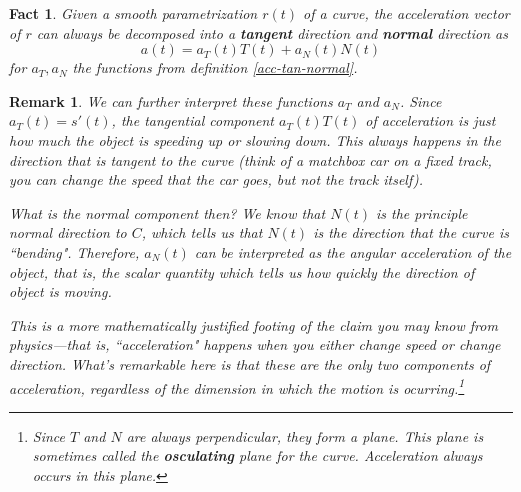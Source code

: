 \documentclass[12pt]{article}
\numberwithin{equation}{subsection}
\numberwithin{figure}{subsection}
\newtheorem{fact}[subsection]{Fact}
\theoremstyle{note}
\newtheorem{remark}[subsection]{Remark}
\begin{document}
{\begin{fact}
	Given a smooth parametrization $r(t)$ of a curve, the acceleration vector of $r$ can always be decomposed into a \textbf{tangent} direction and \textbf{normal} direction as \[ a(t)=a_T(t)T(t)+a_N(t)N(t)\]  for $a_T, a_N$ the functions from definition \ref{acc-tan-normal}.
\end{fact}

\begin{remark}
	We can further interpret these functions $a_T$ and $a_N$. Since $a_T(t)=s'(t)$, the \textit{tangential component} $a_T(t)T(t)$ of acceleration is just how much the object is speeding up or slowing down. This always happens in the direction that is tangent to the curve (think of a matchbox car on a fixed track, you can change the speed that the car goes, but not the track itself). 
	
	What is the \textit{normal component} then? We know that $N(t)$ is the principle normal direction to $C$, which tells us that $N(t)$ is the direction that the curve is ``bending". Therefore, $a_N(t)$ can be interpreted as the angular acceleration of the object, that is, the scalar quantity which tells us how quickly the direction of object is moving. 
	
	This is a more mathematically justified footing of the claim you may know from physics---that is, ``acceleration" happens when you either change speed \textit{or} change direction. What's remarkable here is that these are the only two components of acceleration, regardless of the dimension in which the motion is ocurring.\footnote{Since $T$ and $N$ are always perpendicular, they form a plane. This plane is sometimes called the \textbf{osculating} plane for the curve. Acceleration always occurs in this plane. }

\end{remark}




}
\end{document}

